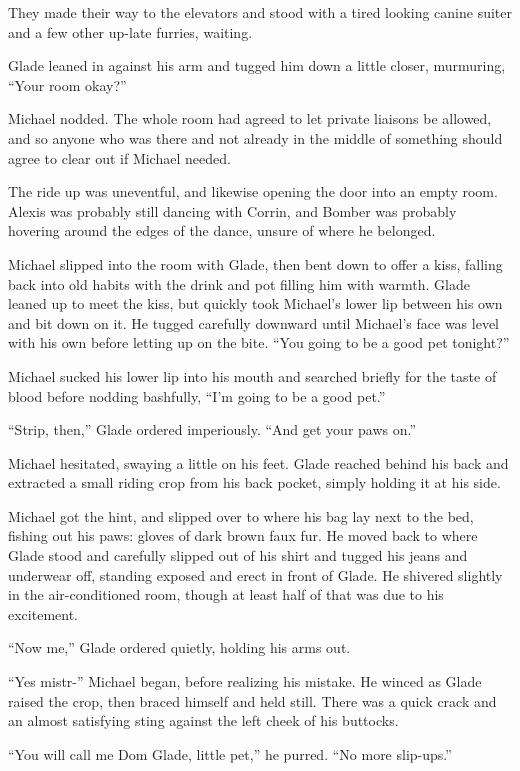 They made their way to the elevators and stood with a tired looking canine suiter and a few other up-late furries, waiting.

Glade leaned in against his arm and tugged him down a little closer, murmuring, ``Your room okay?''

Michael nodded.  The whole room had agreed to let private liaisons be allowed, and so anyone who was there and not already in the middle of something should agree to clear out if Michael needed.

The ride up was uneventful, and likewise opening the door into an empty room.  Alexis was probably still dancing with Corrin, and Bomber was probably hovering around the edges of the dance, unsure of where he belonged.

Michael slipped into the room with Glade, then bent down to offer a kiss, falling back into old habits with the drink and pot filling him with warmth.  Glade leaned up to meet the kiss, but quickly took Michael's lower lip between his own and bit down on it.  He tugged carefully downward until Michael's face was level with his own before letting up on the bite.  ``You going to be a good pet tonight?''

Michael sucked his lower lip into his mouth and searched briefly for the taste of blood before nodding bashfully, ``I'm going to be a good pet.''

``Strip, then,'' Glade ordered imperiously.  ``And get your paws on.''

Michael hesitated, swaying a little on his feet.  Glade reached behind his back and extracted a small riding crop from his back pocket, simply holding it at his side.

Michael got the hint, and slipped over to where his bag lay next to the bed, fishing out his paws: gloves of dark brown faux fur.  He moved back to where Glade stood and carefully slipped out of his shirt and tugged his jeans and underwear off, standing exposed and erect in front of Glade. He shivered slightly in the air-conditioned room, though at least half of that was due to his excitement.

``Now me,'' Glade ordered quietly, holding his arms out.

``Yes mistr-'' Michael began, before realizing his mistake.  He winced as Glade raised the crop, then braced himself and held still.  There was a quick crack and an almost satisfying sting against the left cheek of his buttocks.

``You will call me Dom Glade, little pet,'' he purred.  ``No more slip-ups.''

